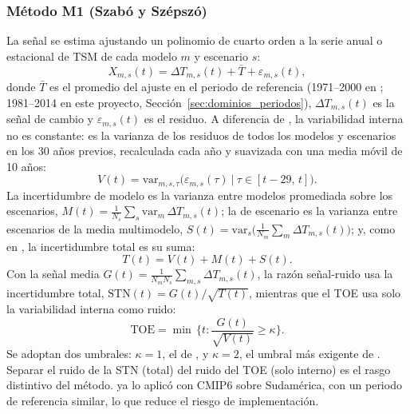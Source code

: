 \subsubsection{Método M1 (Szabó y Szépszó)}

La señal se estima ajustando un polinomio de cuarto orden a la serie anual o estacional de TSM de cada modelo $m$ y escenario $s$:
\begin{equation}
\label{eq:szabo_signal}
X_{m,s}(t) = \Delta T_{m,s}(t) + \bar{T} + \varepsilon_{m,s}(t),
\end{equation}
donde $\bar{T}$ es el promedio del ajuste en el periodo de referencia (1971--2000 en \citealp{szabo2016}; 1981--2014 en este proyecto, Sección~\ref{sec:dominios_periodos}), $\Delta T_{m,s}(t)$ es la señal de cambio y $\varepsilon_{m,s}(t)$ es el residuo. A diferencia de \citet{hawkins2009}, la variabilidad interna no es constante: es la varianza de los residuos de todos los modelos y escenarios en los 30 años previos, recalculada cada año y suavizada con una media móvil de 10 años:
\begin{equation}
\label{eq:szabo_V}
V(t) = \mathrm{var}_{m,s,\tau}\big(\varepsilon_{m,s}(\tau)\ \big|\ \tau \in [t-29,\,t]\big).
\end{equation}
La incertidumbre de modelo es la varianza entre modelos promediada sobre los escenarios, $M(t)=\frac{1}{N_s}\sum_s \mathrm{var}_m\,\Delta T_{m,s}(t)$; la de escenario es la varianza entre escenarios de la media multimodelo, $S(t)=\mathrm{var}_s\big(\frac{1}{N_m}\sum_m \Delta T_{m,s}(t)\big)$; y, como en \citet{hawkins2009}, la incertidumbre total es su suma:
\begin{equation}
\label{eq:szabo_T}
T(t) = V(t) + M(t) + S(t).
\end{equation}
Con la señal media $G(t)=\frac{1}{N_m N_s}\sum_{m,s}\Delta T_{m,s}(t)$, la razón señal-ruido usa la incertidumbre total, $\mathrm{STN}(t) = G(t)/\sqrt{T(t)}$, mientras que el TOE usa solo la variabilidad interna como ruido:
\begin{equation}
\label{eq:szabo_toe}
\mathrm{TOE} = \min\,\Big\{t : \frac{G(t)}{\sqrt{V(t)}} \geq \kappa\Big\}.
\end{equation}
Se adoptan dos umbrales: $\kappa=1$, el de \citet{szabo2016}, y $\kappa=2$, el umbral más exigente de \citet{hawkins2012}. Separar el ruido de la STN (total) del ruido del TOE (solo interno) es el rasgo distintivo del método. \citet{bruno2023} ya lo aplicó con CMIP6 sobre Sudamérica, con un periodo de referencia similar, lo que reduce el riesgo de implementación.

